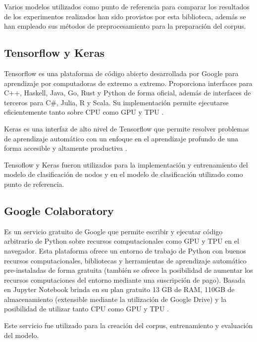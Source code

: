 Varios modelos utilizados como punto de referencia para comparar los resultados
de los experimentos realizados han sido provistos por esta biblioteca, adem\'as se han
empleado sus m\'etodos de preprocesamiento para la preparaci\'on del corpus.

\subsection{Tensorflow y Keras}
Tensorflow es una plataforma de c\'odigo abierto desarrollada por Google para
aprendizaje por computadoras de extremo a extremo. Proporciona interfaces para
C++, Haskell, Java, Go, Rust y Python de forma oficial, adem\'as de interfaces de
terceros para C\#, Julia, R y Scala. Su implementaci\'on permite ejecutarse
eficientemente tanto sobre CPU como GPU y TPU \cite{tensorflow2015-whitepaper}.

Keras es una interfaz de alto nivel de Tensorflow que permite resolver problemas
de aprendizaje autom\'atico con un enfoque en el aprendizaje profundo de una forma
accesible y altamente productiva \cite{chollet2015keras}.

Tensoflow y Keras fueron utilizados para la implementaci\'on y entrenamiento 
del modelo de clasificaci\'on de nodos y en el modelo de clasificaci\'on utilizado
como punto de referencia.

\subsection{Google Colaboratory}
Es un servicio gratuito de Google que permite escribir y ejecutar
c\'odigo arbitrario de Python sobre recursos computacionales como GPU y TPU en
el navegador. Esta plataforma ofrece un entorno de trabajo de Python con buenos recursos computacionales,
bibliotecas y herramientas de aprendizaje autom\'atico pre-instaladas de forma
gratuita (tambi\'en se ofrece la posibilidad de aumentar los recursos computaciones del entorno mediante una suscripci\'on de pago).
Basada en Jupyter Notebook brinda en su plan gratuito 13 GB de RAM, 110GB de almacenamiento (extensible mediante la utilizaci\'on de Google Drive) y
la posibilidad de utilizar tanto CPU como GPU y TPU \cite{google2014colab}.

Este servicio fue utilizado para la creaci\'on del corpus, entrenamiento y evaluaci\'on
del modelo.







